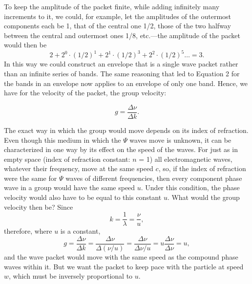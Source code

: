 To keep the amplitude of the packet finite, while adding infinitely many
increments to it, we could, for example, let the amplitudes of the
outermost components each be 1, that of the central one 1/2, those of
the two halfway between the central and outermost ones 1/8, etc.---the
amplitude of the packet would then be
\begin{equation*}
2 + 2^0\cdot(1/2)^1 + 2^1\cdot(1/2)^3 + 2^2\cdot(1/2)^5 \ldots = 3.
\end{equation*}
In this way we could construct an envelope that is a single wave packet rather
than an infinite series of bands. The same reasoning that led to Equation 2 for
the bands in an envelope now applies to an envelope of only one band.
Hence, we have for the velocity of the packet, the group velocity:

\begin{equation*}\tag{3}
g = \frac{\Delta\nu}{\Delta k}.
\end{equation*}

The exact way in which the group would move depends on its index of
refraction. Even though this medium in which the $\Psi$ waves move is
unknown, it can be characterized in one way by its effect on the speed
of the waves. For just as in empty space (index of refraction constant:
$n$ = 1) all electromagnetic waves, whatever their frequency, move
at the same speed $c$, so, if the index of refraction were the same
for $\Psi$ waves of different frequencies, then every component phase
wave in a group would have the same speed $u$. Under this
condition, the phase velocity would also have to be equal to this
constant $u$. What would the group velocity then be? Since
\begin{equation*}
k = \frac{1}{\lambda} = \frac{\nu}{u},
\end{equation*}
therefore, where $u$ is a constant,
\begin{equation*}
g = \frac{\Delta\nu}{\Delta k} = \frac{\Delta\nu}{\Delta(\nu/u)} =
\frac{\Delta\nu}{\Delta\nu/u} = u\frac{\Delta\nu}{\Delta\nu} = u,
\end{equation*}
and the wave packet would move with the same speed as the compound phase
waves within it. But we want the packet to keep pace with the particle
at speed $w$, which must be inversely proportional to $u$.

